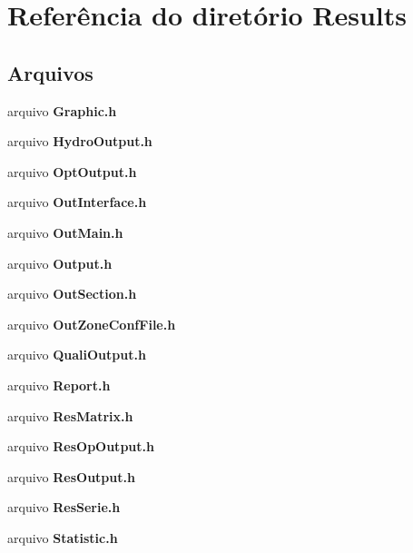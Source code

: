 \section{Referência do diretório Results}
\label{dir_51794704aa34f9942239d3b3443c88cc}
\subsection*{Arquivos}
\begin{DoxyCompactItemize}
\item 
arquivo {\bf Graphic.\+h}
\item 
arquivo {\bf Hydro\+Output.\+h}
\item 
arquivo {\bf Opt\+Output.\+h}
\item 
arquivo {\bf Out\+Interface.\+h}
\item 
arquivo {\bf Out\+Main.\+h}
\item 
arquivo {\bf Output.\+h}
\item 
arquivo {\bf Out\+Section.\+h}
\item 
arquivo {\bf Out\+Zone\+Conf\+File.\+h}
\item 
arquivo {\bf Quali\+Output.\+h}
\item 
arquivo {\bf Report.\+h}
\item 
arquivo {\bf Res\+Matrix.\+h}
\item 
arquivo {\bf Res\+Op\+Output.\+h}
\item 
arquivo {\bf Res\+Output.\+h}
\item 
arquivo {\bf Res\+Serie.\+h}
\item 
arquivo {\bf Statistic.\+h}
\end{DoxyCompactItemize}
